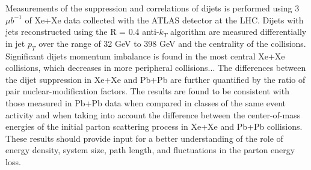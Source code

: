 \begin{abstract*}
Measurements of the suppression and correlations of dijets is performed using 3 $\mu b^{-1}$ of Xe+Xe data collected with the ATLAS detector at the LHC.
Dijets with jets reconstructed using the R = 0.4 anti-$k_T$ algorithm are measured differentially in jet $p_T$ over the range of 32 GeV to 398 GeV and the centrality of the collisions. Significant dijets momentum imbalance is found in the most central Xe+Xe collisions, which decreases in more peripheral collisions...
The differences between the dijet suppression in Xe+Xe and Pb+Pb are further quantified by the ratio of pair nuclear-modification factors. The results are found to be consistent with those measured in Pb+Pb data when compared in classes of the same event activity and when taking into account the difference between the center-of-mass energies of the initial parton scattering process in Xe+Xe and Pb+Pb collisions.
These results should provide input for a better understanding of the role of energy density, system size, path length, and fluctuations in the parton energy loss.

\end{abstract*}